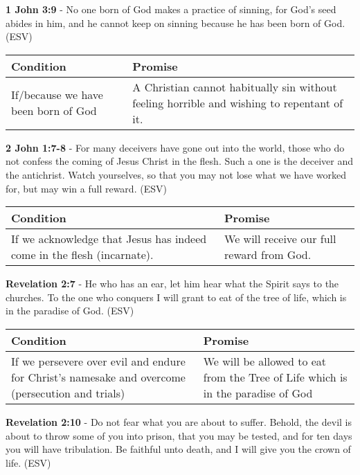 \documentclass[11pt]{article}
\begin{document}
\textbf{1 John 3:9} - No one born of God makes a practice of sinning, for God's seed abides in him, and he cannot keep on sinning because he has been born of God. (ESV)

\begin{center}
\begin{tabular}{ll}
Condition & Promise\\[0pt]
\hline
If/because we have been born of God & A Christian cannot habitually sin without feeling horrible and wishing to repentant of it.\\[0pt]
\end{tabular}
\end{center}

\textbf{2 John 1:7-8} - For many deceivers have gone out into the world, those who do not confess the coming of Jesus Christ in the flesh. Such a one is the deceiver and the antichrist. Watch yourselves, so that you may not lose what we have worked for, but may win a full reward. (ESV)

\begin{center}
\begin{tabular}{ll}
Condition & Promise\\[0pt]
\hline
If we acknowledge that Jesus has indeed come in the flesh (incarnate). & We will receive our full reward from God.\\[0pt]
\end{tabular}
\end{center}

\textbf{Revelation 2:7} - He who has an ear, let him hear what the Spirit says to the churches. To the one who conquers I will grant to eat of the tree of life, which is in the paradise of God. (ESV)

\begin{center}
\begin{tabular}{ll}
Condition & Promise\\[0pt]
\hline
If we persevere over evil and endure for Christ's namesake and overcome (persecution and trials) & We will be allowed to eat from the Tree of Life which is in the paradise of God\\[0pt]
\end{tabular}
\end{center}

\textbf{Revelation 2:10} - Do not fear what you are about to suffer. Behold, the devil is about to throw some of you into prison, that you may be tested, and for ten days you will have tribulation. Be faithful unto death, and I will give you the crown of life. (ESV)
\end{document}
